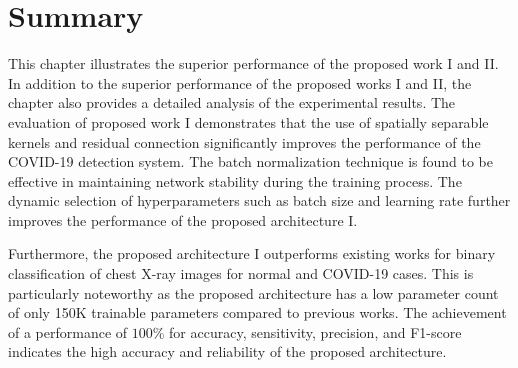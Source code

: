 \section{Summary}


This chapter illustrates the superior performance of the proposed work I and II. In addition to the superior performance of the proposed works I and II, the chapter also provides a detailed analysis of the experimental results. The evaluation of proposed work I demonstrates that the use of spatially separable kernels and residual connection significantly improves the performance of the COVID-19 detection system. The batch normalization technique is found to be effective in maintaining network stability during the training process. The dynamic selection of hyperparameters such as batch size and learning rate further improves the performance of the proposed architecture I.

Furthermore, the proposed architecture I outperforms existing works for binary classification of chest X-ray images for normal and COVID-19 cases. This is particularly noteworthy as the proposed architecture has a low parameter count of only 150K trainable parameters compared to previous works. The achievement of a performance of $100\%$ for accuracy, sensitivity, precision, and F1-score indicates the high accuracy and reliability of the proposed architecture.

